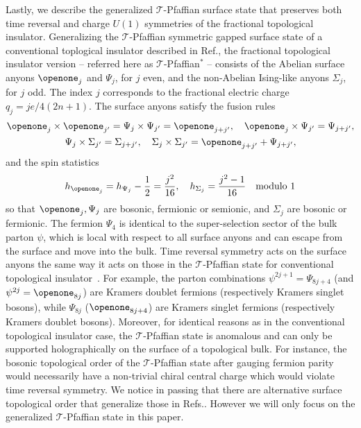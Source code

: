 Lastly, we describe the generalized $\mathcal{T}$-Pfaffian surface state that preserves both time reversal and charge $U(1)$ symmetries of the fractional topological insulator. Generalizing the $\mathcal{T}$-Pfaffian symmetric gapped surface state of a conventional toplogical insulator described in Ref.\cite{ChenFidkowskiVishwanath14}, the fractional topological insulator version -- referred here as $\mathcal{T}$-Pfaffian$^\ast$ -- consists of the Abelian surface anyons $\openone_j$ and $\Psi_j$, for $j$ even, and the non-Abelian Ising-like anyons $\Sigma_j$, for $j$ odd. The index $j$ corresponds to the fractional electric charge $q_j=je/4(2n+1)$. The surface anyons satisfy the fusion rules \begin{gather}\openone_j\times\openone_{j'}=\Psi_j\times\Psi_{j'}=\openone_{j+j'},\quad\openone_j\times\Psi_{j'}=\Psi_{j+j'},\nonumber\\\Psi_j\times\Sigma_{j'}=\Sigma_{j+j'},\quad\Sigma_j\times\Sigma_{j'}=\openone_{j+j'}+\Psi_{j+j'},\label{TPffusion}\end{gather} and the spin statistics \begin{gather}h_{\openone_j}=h_{\Psi_j}-\frac{1}{2}=\frac{j^2}{16},\quad h_{\Sigma_j}=\frac{j^2-1}{16}\quad\mbox{modulo 1}\end{gather} so that $\openone_j,\Psi_j$ are bosonic, fermionic or semionic, and $\Sigma_j$ are bosonic or fermionic. The fermion $\Psi_4$ is identical to the super-selection sector of the bulk parton $\psi$, which is local with respect to all surface anyons and can escape from the surface and move into the bulk. Time reversal symmetry acts on the surface anyons the same way it acts on those in the $\mathcal{T}$-Pfaffian state for conventional topological insulator~\cite{ChenFidkowskiVishwanath14,ChoTeoFradkin17}. For example, the parton combinations $\psi^{2j+1}=\Psi_{8j+4}$ (and $\psi^{2j}=\openone_{8j}$) are Kramers doublet fermions (respectively Kramers singlet bosons), while $\Psi_{8j}$ ($\openone_{8j+4}$) are Kramers singlet fermions (respectively Kramers doublet bosons). Moreover, for identical reasons as in the conventional topological insulator case, the $\mathcal{T}$-Pfaffian state is anomalous and can only be supported holographically on the surface of a topological bulk. For instance, the bosonic topological order of the $\mathcal{T}$-Pfaffian state after gauging fermion parity would necessarily have a non-trivial chiral central charge which would 
violate time reversal symmetry. We notice in passing that there are alternative surface topological order that generalize those in Refs.\cite{WangPotterSenthilgapTI13,MetlitskiKaneFisher13b}. However we will only focus on the generalized $\mathcal{T}$-Pfaffian state in this paper.

